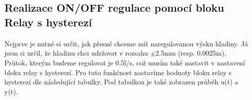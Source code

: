 \documentclass{article}
\begin{document}
\begin{table}[H]
\centering
{}
\caption{Legenda k Relay s Hysterezí}
\label{tab:simulink}
\end{table}
	
	\subsection{Realizace ON/OFF regulace pomocí bloku Relay s hysterezí}
	\paragraph{}
	Nejprve je nutné si určit, jak přesně chceme mít naregulovanou výsku hladiny. Já jsem si určil, že hladinu chci udržovat v rozsahu $\pm$2.5mm (resp. 0.0025m). Průtok, kterým budeme regulovat je 0.5l/s, což musím také nastavit v nastavení bloku relay s hysterezí. Pro tuto funkčnost nastavíme hodnoty bloku relay s hysterezí dle následující tabulky. Pod tabulkou je také zobrazen průběh u(t) a y(t).
	
\end{document}
